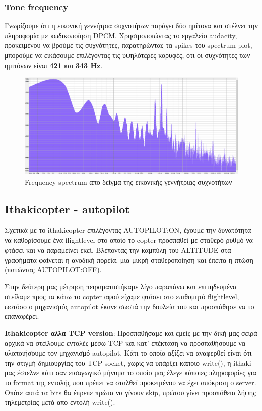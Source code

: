 \documentclass[hidelinks, 12pt, a4paper]{article}
\begin{document}
\subsubsection{Tone frequency}

Γνωρίζουμε ότι η εικονική γεννήτρια συχνοτήτων παράγει δύο ημίτονα και στέλνει την πληροφορία με κωδικοποίηση DPCM. Χρησιμοποιώντας το εργαλείο audacity, προκειμένου να βρούμε τις συχνότητες, παρατηρώντας τα spikes του spectrum plot, μπορούμε να εικάσουμε επιλέγοντας τις υψηλότερες κορυφές, ότι οι συχνότητες των ημιτόνων είναι \textbf{421} και \textbf{343 Hz}.

\begin{figure}[h!]
\centering
	\includegraphics[height=.3\textheight, width=\textwidth]{assets/session1/spectrum.png}
    \caption{Frequency spectrum απο δείγμα της εικονικής γεννήτριας συχνοτήτων}
\end{figure}


\subsection{Ithakicopter - autopilot}

Σχετικά με το ithakicopter επιλέγοντας AUTOPILOT:ON, έχουμε την δυνατότητα να καθορίσουμε ένα flightlevel στο οποίο το copter προσπαθεί με σταθερό ρυθμό να φτάσει και να παραμείνει εκεί. Βλέποντας την καμπύλη του ALTITUDE στα γραφήματα φαίνεται η ανοδική πορεία, μια μικρή σταθεροποίηση και έπειτα η πτώση (πατώντας AUTOPILOT:OFF). 

Στην δεύτερη μας μέτρηση πειραματιστήκαμε λίγο παραπάνω και επιτηδευμένα στείλαμε προς τα κάτω το copter αφού είχαμε φτάσει στο επιθυμητό flightlevel, ωστόσο ο μηχανισμός autopilot έκανε σωστά την δουλεία του και προσπάθησε να το επαναφέρει.


\textbf{Ithakicopter αλλα TCP version}: Προσπαθήσαμε και εμείς με την δική μας σειρά αρχικά να στείλουμε εντολές μέσω TCP και κατ' επέκταση να προσπαθήσουμε να υλοποιήσουμε τον μηχανισμό autopilot. Κάτι το οποίο αξίζει να αναφερθεί είναι ότι την στιγμή δημιουργίας του TCP socket, χωρίς να υπάρξει κάποιο write(), η ithaki μας έστελνε κάτι σαν εισαγωγικό μήνυμα το οποίο μας έλεγε κάποιες πληροφορίες για το format της εντολής που πρέπει να σταλθεί προκειμένου να έχει απόκριση ο server. Οπότε αυτά τα bits θα έπρεπε πρώτα να γίνουν skip, πρώτου γίνει προσπάθεια λήψης τηλεμετρίας μετά απο εντολή write(). 
\end{document}
